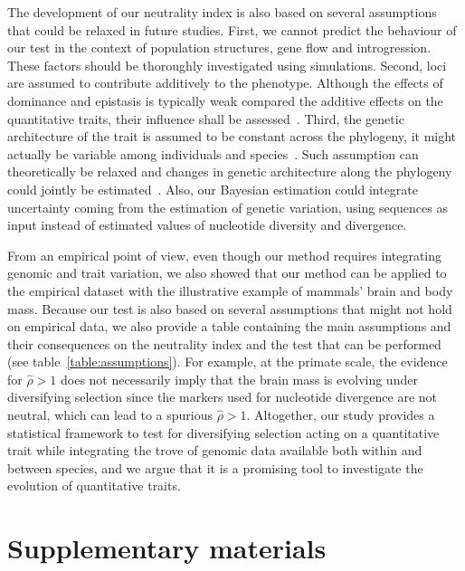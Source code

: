 \documentclass{article}
\newcommand{\EstNI}{\widehat{\rho}}
\begin{document}
The development of our neutrality index is also based on several assumptions that could be relaxed in future studies.
First, we cannot predict the behaviour of our test in the context of population structures, gene flow and introgression.
These factors should be thoroughly investigated using simulations.
Second, loci are assumed to contribute additively to the phenotype.
Although the effects of dominance and epistasis is typically weak compared the additive effects on the quantitative traits, their influence shall be assessed~\parencite{hill_data_2008, crow_epistasis_2010}.
Third, the genetic architecture of the trait is assumed to be constant across the phylogeny, it might actually be variable among individuals and species~\parencite{tung_genetic_2015, huber_conservatism_2015}.
Such assumption can theoretically be relaxed and changes in genetic architecture along the phylogeny could jointly be estimated~\parencite{arnold_understanding_2008, hohenlohe_mipod_2008, kostikova_bridging_2016, gaboriau_multiplatform_2020}.
Also, our Bayesian estimation could integrate uncertainty coming from the estimation of genetic variation, using sequences as input instead of estimated values of nucleotide diversity and divergence.

From an empirical point of view, even though our method requires integrating genomic and trait variation, we also showed that our method can be applied to the empirical dataset with the illustrative example of mammals' brain and body mass.
Because our test is also based on several assumptions that might not hold on empirical data, we also provide a table containing the main assumptions and their consequences on the neutrality index and the test that can be performed (see table~\ref{table:assumptions}).
For example, at the primate scale, the evidence for $\EstNI > 1$ does not necessarily imply that the brain mass is evolving under diversifying selection since the markers used for nucleotide divergence are not neutral, which can lead to a spurious $\EstNI > 1$.
Altogether, our study provides a statistical framework to test for diversifying selection acting on a quantitative trait while integrating the trove of genomic data available both within and between species, and we argue that it is a promising tool to investigate the evolution of quantitative traits.


\printbibliography

\newpage

\part*{Supplementary materials}
\renewcommand{\thetable}{S\arabic{table}}
\renewcommand{\thefigure}{S\arabic{figure}}
\setcounter{figure}{0}
\setcounter{table}{0}
\setcounter{section}{0}
\end{document}
